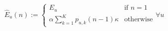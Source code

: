 \begin{equation}
	\hat{E}_u(n) :=
	\begin{cases}
		E_u &\text{if } n = 1\\
		\alpha \sum_{k=1}^K p_{u,k}(n-1)\kappa &\text{otherwise}
	\end{cases}
	\forall u
	\label{ch3:equ:intermediate-demand-energy-expanded}
\end{equation}